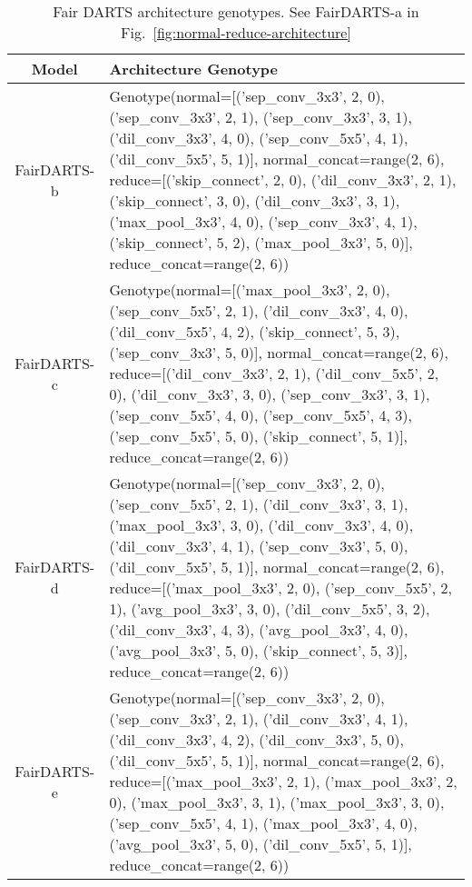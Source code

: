 \documentclass[runningheads]{llncs}
\begin{document}
\begin{table*}
	\begin{center}
		\caption{Fair DARTS architecture genotypes.  See FairDARTS-a in Fig.~\ref{fig:normal-reduce-architecture}}
		\label{tab:fairdarts_models}
		\begin{footnotesize}
			\begin{tabular}{cp{10cm}}
				\hline
				Model & Architecture Genotype  \\
				\hline
				FairDARTS-b & 
				Genotype(normal=[('sep\_conv\_3x3', 2, 0), ('sep\_conv\_3x3', 2, 1), ('sep\_conv\_3x3', 3, 1), ('dil\_conv\_3x3', 4, 0), ('sep\_conv\_5x5', 4, 1), ('dil\_conv\_5x5', 5, 1)], normal\_concat=range(2, 6), 
				reduce=[('skip\_connect', 2, 0), ('dil\_conv\_3x3', 2, 1), ('skip\_connect', 3, 0), ('dil\_conv\_3x3', 3, 1), ('max\_pool\_3x3', 4, 0), ('sep\_conv\_3x3', 4, 1), ('skip\_connect', 5, 2), ('max\_pool\_3x3', 5, 0)], reduce\_concat=range(2, 6))
				
				
				\\
				
				FairDARTS-c & 	Genotype(normal=[('max\_pool\_3x3', 2, 0), ('sep\_conv\_5x5', 2, 1), ('dil\_conv\_3x3', 4, 0), ('dil\_conv\_5x5', 4, 2), ('skip\_connect', 5, 3), ('sep\_conv\_3x3', 5, 0)], normal\_concat=range(2, 6),
				reduce=[('dil\_conv\_3x3', 2, 1), ('dil\_conv\_5x5', 2, 0), ('dil\_conv\_3x3', 3, 0), ('sep\_conv\_3x3', 3, 1), ('sep\_conv\_5x5', 4, 0), ('sep\_conv\_5x5', 4, 3), ('sep\_conv\_5x5', 5, 0), ('skip\_connect', 5, 1)], reduce\_concat=range(2, 6))
				
				\\
				FairDARTS-d &  				
				Genotype(normal=[('sep\_conv\_3x3', 2, 0), ('sep\_conv\_5x5', 2, 1), ('dil\_conv\_3x3', 3, 1), ('max\_pool\_3x3', 3, 0), ('dil\_conv\_3x3', 4, 0), ('dil\_conv\_3x3', 4, 1), ('sep\_conv\_3x3', 5, 0), ('dil\_conv\_5x5', 5, 1)], normal\_concat=range(2, 6), 
				reduce=[('max\_pool\_3x3', 2, 0), ('sep\_conv\_5x5', 2, 1), ('avg\_pool\_3x3', 3, 0), ('dil\_conv\_5x5', 3, 2), ('dil\_conv\_3x3', 4, 3), ('avg\_pool\_3x3', 4, 0), ('avg\_pool\_3x3', 5, 0), ('skip\_connect', 5, 3)], reduce\_concat=range(2, 6))
				
				\\
				FairDARTS-e & Genotype(normal=[('sep\_conv\_3x3', 2, 0), ('sep\_conv\_3x3', 2, 1), ('dil\_conv\_3x3', 4, 1), ('dil\_conv\_3x3', 4, 2), ('dil\_conv\_3x3', 5, 0), ('dil\_conv\_5x5', 5, 1)], normal\_concat=range(2, 6), 
				reduce=[('max\_pool\_3x3', 2, 1), ('max\_pool\_3x3', 2, 0), ('max\_pool\_3x3', 3, 1), ('max\_pool\_3x3', 3, 0), ('sep\_conv\_5x5', 4, 1), ('max\_pool\_3x3', 4, 0), ('avg\_pool\_3x3', 5, 0), ('dil\_conv\_5x5', 5, 1)], reduce\_concat=range(2, 6))
				

\end{tabular}
\end{footnotesize}
\end{center}
\end{table*}
\end{document}
